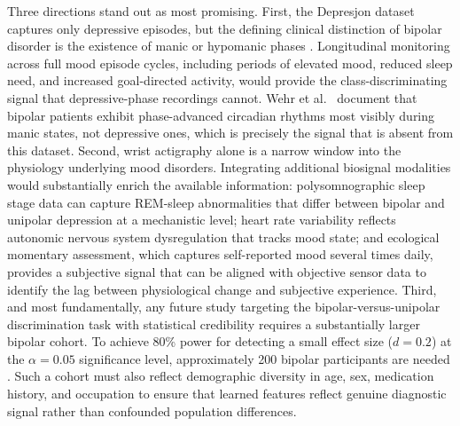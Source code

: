 Three directions stand out as most promising. First, the Depresjon dataset captures only depressive episodes, but the defining clinical distinction of bipolar disorder is the existence of manic or hypomanic phases \cite{goodwin2007manic}. Longitudinal monitoring across full mood episode cycles, including periods of elevated mood, reduced sleep need, and increased goal-directed activity, would provide the class-discriminating signal that depressive-phase recordings cannot. Wehr et al.\ \cite{wehr1987sleep} document that bipolar patients exhibit phase-advanced circadian rhythms most visibly during manic states, not depressive ones, which is precisely the signal that is absent from this dataset. Second, wrist actigraphy alone is a narrow window into the physiology underlying mood disorders. Integrating additional biosignal modalities would substantially enrich the available information: polysomnographic sleep stage data can capture REM-sleep abnormalities that differ between bipolar and unipolar depression at a mechanistic level; heart rate variability reflects autonomic nervous system dysregulation that tracks mood state; and ecological momentary assessment, which captures self-reported mood several times daily, provides a subjective signal that can be aligned with objective sensor data to identify the lag between physiological change and subjective experience. Third, and most fundamentally, any future study targeting the bipolar-versus-unipolar discrimination task with statistical credibility requires a substantially larger bipolar cohort. To achieve 80\% power for detecting a small effect size ($d = 0.2$) at the $\alpha = 0.05$ significance level, approximately 200 bipolar participants are needed \cite{cohen1988statistical}. Such a cohort must also reflect demographic diversity in age, sex, medication history, and occupation to ensure that learned features reflect genuine diagnostic signal rather than confounded population differences.

